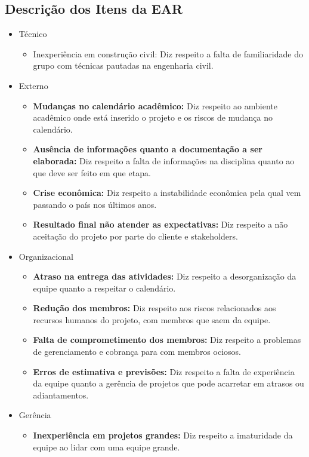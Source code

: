 \subsection{Descrição dos Itens da EAR}
\begin{itemize}
  \item Técnico
    \begin{itemize}
      \item Inexperiência em construção civil: Diz respeito a falta de familiaridade do grupo com técnicas pautadas na engenharia civil.
    \end{itemize}
  \item Externo
  \begin{itemize}
    \item \textbf{Mudanças no calendário acadêmico:} Diz respeito ao ambiente acadêmico onde está inserido o projeto e os riscos de mudança no calendário.
    \item \textbf{Ausência de informações quanto a documentação a ser elaborada:} Diz respeito a falta de informações na disciplina quanto ao que deve ser feito em que etapa.
    \item \textbf{Crise econômica:} Diz respeito a instabilidade econômica pela qual vem passando o país nos últimos anos.
    \item \textbf{Resultado final não atender as expectativas:} Diz respeito a não aceitação do projeto por parte do cliente e stakeholders.
  \end{itemize}


  \item Organizacional
  \begin{itemize}
    \item \textbf{Atraso na entrega das atividades:} Diz respeito a desorganização da equipe quanto a respeitar o calendário.
    \item \textbf{Redução dos membros:} Diz respeito aos riscos relacionados aos recursos humanos do projeto, com membros que saem da equipe.
    \item \textbf{Falta de comprometimento dos membros:} Diz respeito a problemas de gerenciamento e cobrança para com membros ociosos.
    \item \textbf{Erros de estimativa e previsões:} Diz respeito a falta de experiência da equipe quanto a gerência de projetos que pode acarretar em atrasos ou adiantamentos.
  \end{itemize}

  \item Gerência
  \begin{itemize}
    \item \textbf{Inexperiência em projetos grandes:} Diz respeito a imaturidade da equipe ao lidar com uma equipe grande.
  \end{itemize}

\end{itemize}

